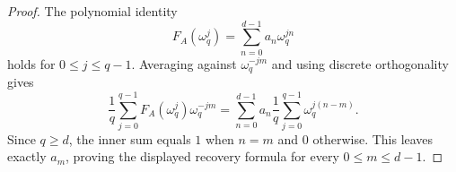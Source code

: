 \begin{proof}
  The polynomial identity
  \[
    F_A(\omega_q^j)=\sum_{n=0}^{d-1}a_n\omega_q^{jn}
  \]
  holds for \(0\le j\le q-1\). Averaging against
  \(\omega_q^{-jm}\) and using discrete orthogonality gives
  \[
    \frac{1}{q}\sum_{j=0}^{q-1}
      F_A(\omega_q^j)\omega_q^{-jm}
    =
    \sum_{n=0}^{d-1}a_n
      \frac{1}{q}\sum_{j=0}^{q-1}\omega_q^{j(n-m)}.
  \]
  Since \(q\ge d\), the inner sum equals \(1\) when \(n=m\) and \(0\)
  otherwise. This leaves exactly \(a_m\), proving the displayed recovery
  formula for every \(0\le m\le d-1\).
\end{proof}


